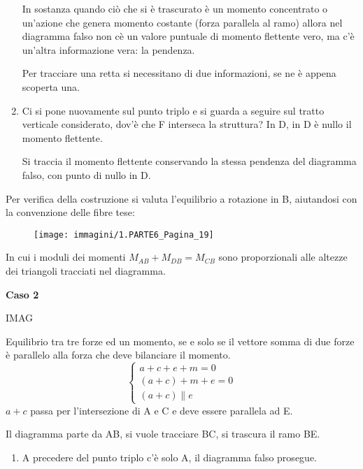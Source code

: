 \documentclass{article}
\begin{document}
\begin{adjustwidth}{2in}{}
\begin{enumerate}
		In sostanza quando ciò che si è trascurato è un momento concentrato  o un'azione che genera momento costante (forza parallela al ramo) allora nel diagramma falso non cè un valore puntuale di momento flettente vero, ma c'è un'altra informazione vera: la pendenza. 
		
		Per tracciare una retta si necessitano di due informazioni, se ne è appena scoperta una.
		
		\item Ci si pone nuovamente sul punto triplo e si guarda a seguire sul tratto verticale considerato, dov'è che F interseca la struttura? In D, in D è nullo il momento flettente. 
		
		Si traccia il momento flettente conservando la stessa pendenza del diagramma falso, con punto di nullo in D. 

	\end{enumerate}

	Per verifica della costruzione si valuta
	l’equilibrio a rotazione in B, aiutandosi
	con la convenzione delle fibre tese:
	
		\begin{figure}[H]
		\centering
		\texttt{[image: immagini/1.PARTE6\_Pagina\_19]}
	\end{figure}
	
In cui i moduli dei momenti $ M_{AB} + M_{DB} = M_{CB} $ sono proporzionali alle altezze dei triangoli tracciati nel diagramma.  \newline

\textbf{Caso 2} \newline

IMAG

Equilibrio tra tre forze ed un momento, se e solo se il vettore somma di due forze è parallelo alla forza che deve bilanciare il momento. 
\[\begin{cases}
	a+c+e+m = 0 \\
	(a+c)+m+e=0 \\
	(a+c)\parallel e
\end{cases}\]
$a+c$ passa per l'intersezione di A e C e deve essere parallela ad E. \newline 

Il diagramma parte da AB, si vuole tracciare BC, si trascura il ramo BE. 

\begin{enumerate}
	\item  A precedere del punto triplo c'è solo A, il diagramma falso prosegue. 
	

\end{enumerate}
\end{adjustwidth}
\end{document}
